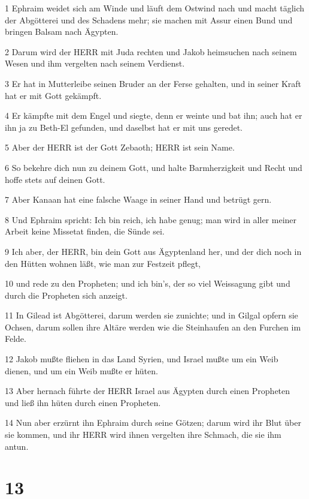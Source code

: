 \par 1 Ephraim weidet sich am Winde und läuft dem Ostwind nach und macht täglich der Abgötterei und des Schadens mehr; sie machen mit Assur einen Bund und bringen Balsam nach Ägypten.
\par 2 Darum wird der HERR mit Juda rechten und Jakob heimsuchen nach seinem Wesen und ihm vergelten nach seinem Verdienst.
\par 3 Er hat in Mutterleibe seinen Bruder an der Ferse gehalten, und in seiner Kraft hat er mit Gott gekämpft.
\par 4 Er kämpfte mit dem Engel und siegte, denn er weinte und bat ihn; auch hat er ihn ja zu Beth-El gefunden, und daselbst hat er mit uns geredet.
\par 5 Aber der HERR ist der Gott Zebaoth; HERR ist sein Name.
\par 6 So bekehre dich nun zu deinem Gott, und halte Barmherzigkeit und Recht und hoffe stets auf deinen Gott.
\par 7 Aber Kanaan hat eine falsche Waage in seiner Hand und betrügt gern.
\par 8 Und Ephraim spricht: Ich bin reich, ich habe genug; man wird in aller meiner Arbeit keine Missetat finden, die Sünde sei.
\par 9 Ich aber, der HERR, bin dein Gott aus Ägyptenland her, und der dich noch in den Hütten wohnen läßt, wie man zur Festzeit pflegt,
\par 10 und rede zu den Propheten; und ich bin's, der so viel Weissagung gibt und durch die Propheten sich anzeigt.
\par 11 In Gilead ist Abgötterei, darum werden sie zunichte; und in Gilgal opfern sie Ochsen, darum sollen ihre Altäre werden wie die Steinhaufen an den Furchen im Felde.
\par 12 Jakob mußte fliehen in das Land Syrien, und Israel mußte um ein Weib dienen, und um ein Weib mußte er hüten.
\par 13 Aber hernach führte der HERR Israel aus Ägypten durch einen Propheten und ließ ihn hüten durch einen Propheten.
\par 14 Nun aber erzürnt ihn Ephraim durch seine Götzen; darum wird ihr Blut über sie kommen, und ihr HERR wird ihnen vergelten ihre Schmach, die sie ihm antun.

\chapter{13}

